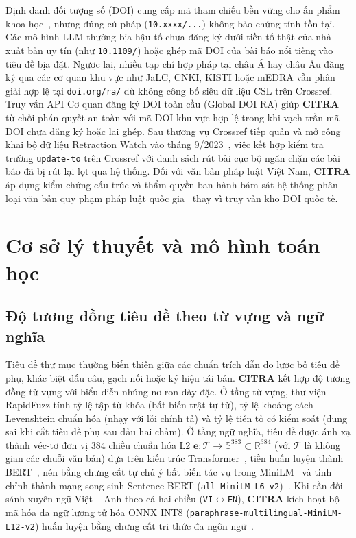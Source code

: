 Định danh đối tượng số (DOI) cung cấp mã tham chiếu bền vững cho ấn phẩm khoa học~\cite{doi-handbook}, nhưng đúng cú pháp (\texttt{10.xxxx/...}) không bảo chứng tính tồn tại. Các mô hình LLM thường bịa hậu tố chưa đăng ký dưới tiền tố thật của nhà xuất bản uy tín (như \texttt{10.1109/}) hoặc ghép mã DOI của bài báo nổi tiếng vào tiêu đề bịa đặt. Ngược lại, nhiều tạp chí hợp pháp tại châu Á hay châu Âu đăng ký qua các cơ quan khu vực như JaLC, CNKI, KISTI hoặc mEDRA vẫn phân giải hợp lệ tại \texttt{doi.org/ra/} dù không công bố siêu dữ liệu CSL trên Crossref. Truy vấn API Cơ quan đăng ký DOI toàn cầu (Global DOI RA) giúp \textbf{CITRA} từ chối phán quyết an toàn với mã DOI khu vực hợp lệ trong khi vạch trần mã DOI chưa đăng ký hoặc lai ghép. Sau thương vụ Crossref tiếp quản và mở công khai bộ dữ liệu Retraction Watch vào tháng 9/2023~\cite{crossref-rw2023}, việc kết hợp kiểm tra trường \texttt{update-to} trên Crossref với danh sách rút bài cục bộ ngăn chặn các bài báo đã bị rút lại lọt qua hệ thống. Đối với văn bản pháp luật Việt Nam, \textbf{CITRA} áp dụng kiểm chứng cấu trúc và thẩm quyền ban hành bám sát hệ thống phân loại văn bản quy phạm pháp luật quốc gia~\cite{vbpl-vn} thay vì truy vấn kho DOI quốc tế.

\section{Cơ sở lý thuyết và mô hình toán học}

\subsection{Độ tương đồng tiêu đề theo từ vựng và ngữ nghĩa}

Tiêu đề thư mục thường biến thiên giữa các chuẩn trích dẫn do lược bỏ tiêu đề phụ, khác biệt dấu câu, gạch nối hoặc ký hiệu tái bản. \textbf{CITRA} kết hợp độ tương đồng từ vựng với biểu diễn nhúng nơ-ron dày đặc. Ở tầng từ vựng, thư viện RapidFuzz tính tỷ lệ tập từ khóa (bất biến trật tự từ), tỷ lệ khoảng cách Levenshtein chuẩn hóa (nhạy với lỗi chính tả) và tỷ lệ tiền tố có kiểm soát (dung sai khi cắt tiêu đề phụ sau dấu hai chấm). Ở tầng ngữ nghĩa, tiêu đề được ánh xạ thành véc-tơ đơn vị 384 chiều chuẩn hóa L2 $\mathbf{e}: \mathcal{T} \to \mathbb{S}^{383} \subset \mathbb{R}^{384}$ (với $\mathcal{T}$ là không gian các chuỗi văn bản) dựa trên kiến trúc Transformer~\cite{vaswani2017}, tiền huấn luyện thành BERT~\cite{bert}, nén bằng chưng cất tự chú ý bất biến tác vụ trong MiniLM~\cite{wang2020minilm} và tinh chỉnh thành mạng song sinh Sentence-BERT (\texttt{all-MiniLM-L6-v2})~\cite{reimers2019sbert}. Khi cần đối sánh xuyên ngữ Việt -- Anh theo cả hai chiều (\texttt{VI}$\leftrightarrow$\texttt{EN}), \textbf{CITRA} kích hoạt bộ mã hóa đa ngữ lượng tử hóa ONNX INT8 (\texttt{paraphrase-multilingual-MiniLM-L12-v2}) huấn luyện bằng chưng cất tri thức đa ngôn ngữ~\cite{reimers2020multilingual}.

